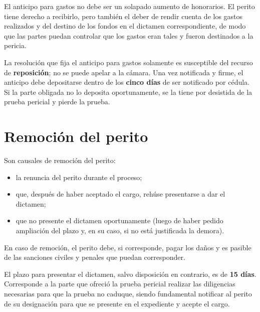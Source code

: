 \documentclass[12pt,oneside]{book}
\begin{document}
\begin{important}
El anticipo para gastos no debe ser un solapado aumento de honorarios. El perito tiene derecho a recibirlo, pero también el deber de rendir cuenta de los gastos realizados y del destino de los fondos en el dictamen correspondiente, de modo que las partes puedan controlar que los gastos eran tales y fueron destinados a la pericia.
\end{important}

La resolución que fija el anticipo para gastos solamente es susceptible del recurso de \textbf{reposición}; no se puede apelar a la cámara. Una vez notificada y firme, el anticipo debe depositarse dentro de los \textbf{cinco días} de ser notificado por cédula. Si la parte obligada no lo deposita oportunamente, se la tiene por desistida de la prueba pericial y pierde la prueba.

\section{Remoción del perito}

Son causales de remoción del perito:

\begin{itemize}
    \item la renuncia del perito durante el proceso;
    \item que, después de haber aceptado el cargo, rehúse presentarse a dar el dictamen;
    \item que no presente el dictamen oportunamente (luego de haber pedido ampliación del plazo y, en su caso, si no está justificada la demora).
\end{itemize}

En caso de remoción, el perito debe, si corresponde, pagar los daños y es pasible de las sanciones civiles y penales que puedan corresponder.

El plazo para presentar el dictamen, salvo disposición en contrario, es de \textbf{15 días}. Corresponde a la parte que ofreció la prueba pericial realizar las diligencias necesarias para que la prueba no caduque, siendo fundamental notificar al perito de su designación para que se presente en el expediente y acepte el cargo.
\end{document}
